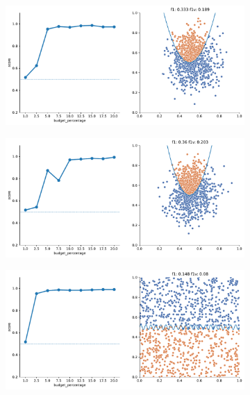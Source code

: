 \begin{figure}
    \begin{subfigure}{.5\textwidth}
        \centering
        \includegraphics[width=\textwidth]{img/2d_v2/4.pdf}
    \end{subfigure}%
    \begin{subfigure}{.5\textwidth}
        \centering
        \includegraphics[width=\textwidth]{img/2d_v2/5.pdf}
    \end{subfigure}
    \hfill
    \begin{subfigure}{.5\textwidth}
        \centering
        \includegraphics[width=\textwidth]{img/2d_v2/7.pdf}

\end{subfigure}
\end{figure}
